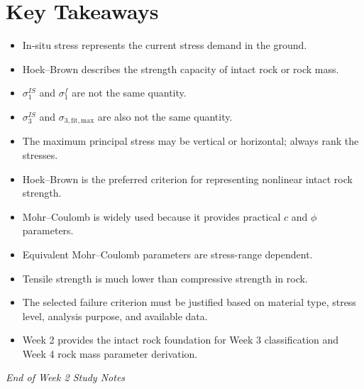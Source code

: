 \documentclass[a4paper,12pt]{article}
\begin{document}
\section{Key Takeaways}

\begin{itemize}
    \item In-situ stress represents the current stress demand in the ground.
    \item Hoek--Brown describes the strength capacity of intact rock or rock mass.
    \item \(\sigma_1^{IS}\) and \(\sigma_1^f\) are not the same quantity.
    \item \(\sigma_3^{IS}\) and \(\sigma_{3,\mathrm{fit,max}}\) are also not the same quantity.
    \item The maximum principal stress may be vertical or horizontal; always rank the stresses.
    \item Hoek--Brown is the preferred criterion for representing nonlinear intact rock strength.
    \item Mohr--Coulomb is widely used because it provides practical \(c\) and \(\phi\) parameters.
    \item Equivalent Mohr--Coulomb parameters are stress-range dependent.
    \item Tensile strength is much lower than compressive strength in rock.
    \item The selected failure criterion must be justified based on material type, stress level,
    analysis purpose, and available data.
    \item Week 2 provides the intact rock foundation for Week 3 classification and Week 4
    rock mass parameter derivation.
\end{itemize}

\vspace{1cm}
\noindent\textit{End of Week 2 Study Notes}
\end{document}
